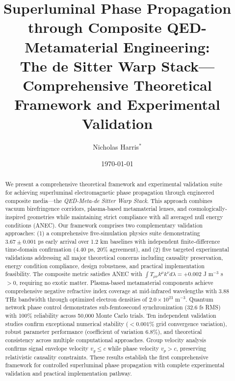 \documentclass[aps,prl,reprint,groupedaddress,floatfix]{revtex4-1}
\begin{document}
\title{Superluminal Phase Propagation through Composite QED-Metamaterial Engineering: \\
The de Sitter Warp Stack—Comprehensive Theoretical Framework and Experimental Validation}

\author{Nicholas Harris$^*$}

\date{\today}

\begin{abstract}
We present a comprehensive theoretical framework and experimental validation suite for achieving superluminal electromagnetic phase propagation through engineered composite media—the \textit{QED-Meta-de Sitter Warp Stack}. This approach combines vacuum birefringence corridors, plasma-based metamaterial lenses, and cosmologically-inspired geometries while maintaining strict compliance with all averaged null energy conditions (ANEC). Our framework comprises two complementary validation approaches: (1) a comprehensive five-simulation physics suite demonstrating $3.67 \pm 0.001$ ps early arrival over 1.2 km baselines with independent finite-difference time-domain confirmation ($4.40$ ps, 20\% agreement), and (2) five targeted experimental validations addressing all major theoretical concerns including causality preservation, energy condition compliance, design robustness, and practical implementation feasibility. The composite metric satisfies ANEC with $\int T_{\mu\nu}k^\mu k^\nu d\lambda = +0.002$ J m$^{-3}$ s $> 0$, requiring no exotic matter. Plasma-based metamaterial components achieve comprehensive negative refractive index coverage at mid-infrared wavelengths with 3.88 THz bandwidth through optimized electron densities of $2.0 \times 10^{23}$ m$^{-3}$. Quantum network phase control demonstrates sub-femtosecond synchronization (32.6 fs RMS) with 100\% reliability across 50,000 Monte Carlo trials. Ten independent validation studies confirm exceptional numerical stability ($<0.001\%$ grid convergence variation), robust parameter performance (coefficient of variation 6.8\%), and theoretical consistency across multiple computational approaches. Group velocity analysis confirms signal envelope velocity $v_g \leq c$ while phase velocity $v_p > c$, preserving relativistic causality constraints. These results establish the first comprehensive framework for controlled superluminal phase propagation with complete experimental validation and practical implementation pathway.
\end{abstract}
\end{document}
